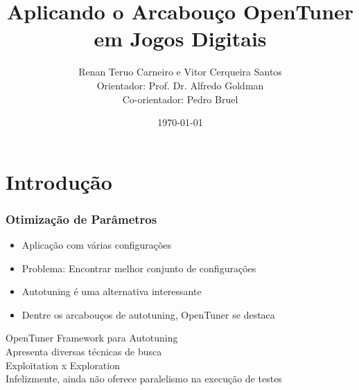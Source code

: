\documentclass[10pt]{beamer}
\title{Aplicando o Arcabouço OpenTuner em Jogos Digitais}
\date{\today}
\author{Renan Teruo Carneiro e Vitor Cerqueira Santos\\
	Orientador: Prof. Dr. Alfredo Goldman\\
    Co-orientador: Pedro Bruel}
\institute{Instituto de Matemática e Estatística}
\begin{document}
\maketitle


\section{Introdução}

\begin{frame}[fragile]
	\frametitle{Otimização de Parâmetros}
	  \begin{itemize}[<+- | alert@+>]
	  	\item Aplicação com várias configurações
	  	\item Problema: Encontrar melhor conjunto de configurações
	  	\item Autotuning é uma alternativa interessante
	  	\item Dentre os arcabouços de autotuning, OpenTuner se destaca
	  \end{itemize}
\end{frame}

\begin{frame}{OpenTuner}
	Framework para Autotuning\pause\\
	Apresenta diversas técnicas de busca\pause\\
	Exploitation x Exploration\pause\\
	Infelizmente, ainda não oferece paralelismo na execução de testes
\end{frame}
\end{document}
